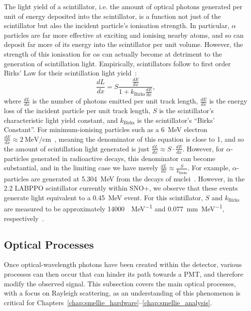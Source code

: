 The light yield of a scintillator, i.e. the amount of optical photons generated per unit of energy deposited into the scintillator, is a function not just of the scintillator but also the incident particle's ionisation strength. In particular, $\alpha$ particles are far more effective at exciting and ionising nearby atoms, and so can deposit far more of its energy into the scintillator per unit volume. However, the strength of this ionisation for $\alpha$s can actually become at detriment to the generation of scintillation light. Empirically, scintillators follow to first order Birks' Law for their scintillation light yield~\cite{birksChapterScintillationProcess1967a}: %
\begin{equation}
    \frac{dL}{dx} = S\frac{\frac{dE}{dx}}{1+k_{\mathrm{Birks}}\frac{dE}{dx}},
\end{equation}
where $\frac{dL}{dx}$ is the number of photons emitted per unit track length, $\frac{dE}{dx}$ is the energy loss of the incident particle per unit track length, $S$ is the scintillator's characteristic light yield constant, and $k_{\mathrm{Birks}}$ is the scintillator's ``Birks' Constant''. For minimum-ionising particles such as a \SI{6}{\MeV} electron $\frac{dE}{dx}\approx\SI{2}{\MeV\per\cm}$~\cite{}, %
meaning the denominator of this equation is close to 1, and so the amount of scintillation light generated is just $\frac{dL}{dx} \approx S\cdot\frac{dE}{dx}$. However, for $\alpha$-particles generated in radioactive decays, this denominator can become substantial, and in the limiting case we have merely $\frac{dL}{dx} \approx \frac{S}{k_{\mathrm{Birks}}}$. For example, $\alpha$-particles are generated at \SI{5.304}{\MeV} from the decays of  nuclei~\cite{kondevNuclearDataSheets2008}. However, in the \SI{2.2}{\gpl} LABPPO scintillator currently within SNO+, we observe that these events generate light equivalent to a \SI{0.45}{\MeV} event. For this scintillator, $S$ and $k_{\mathrm{Birks}}$ are measured to be approximately \SI{14000}{\gamma\per\MeV} and \SI{0.077}{\mm\per\MeV}, respectively~\cite{riccettoRATOptics2g2022}. %


 \subsection{Optical Processes}\label{sec:optical_processes}
 Once optical-wavelength photons have been created within the detector, various processes can then occur that can hinder its path towards a PMT, and therefore modify the observed signal. This subsection covers the main optical processes, with a focus on Rayleigh scattering, as an understanding of this phenomenon is critical for Chapters~\ref{chap:smellie_hardware}--\ref{chap:smellie_analysis}.
